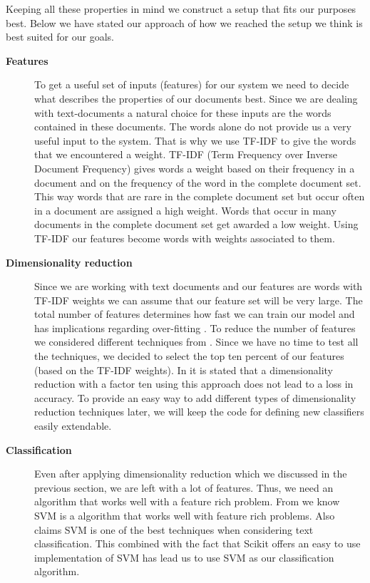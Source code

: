 Keeping all these properties in mind we construct a setup that fits our purposes best.
Below we have stated our approach of how we reached the setup we think is best suited for our goals.

\begin{description}
\item[\textbf{Features}] 
To get a useful set of inputs (features) for our system we need to decide what describes the properties of our documents best. Since we are dealing with text-documents a natural choice for these inputs are the words contained in these documents. 
The words alone do not provide us a very useful input to the system. That is why we use TF-IDF to give the words that we encountered a weight. TF-IDF (Term Frequency over Inverse Document Frequency) gives words a weight based on their frequency in a document and on the frequency of the word in the complete document set. This way words that are rare in the complete document set but occur often in a document are assigned a high weight. Words that occur in many documents in the complete document set get awarded a low weight\cite{ramos_tfidf}.
Using TF-IDF our features become words with weights associated to them.

\item[\textbf{Dimensionality reduction}]
Since we are working with text documents and our features are words with TF-IDF weights we can assume that our feature set will be very large. The total number of features determines how fast we can train our model and has implications regarding over-fitting \cite{ml_text}. To reduce the number of features we considered different techniques from \cite{ml_text}. Since we have no time to test all the techniques, we decided to select the top ten percent of our features (based on the TF-IDF weights). In \cite{yang1997} it is stated that a dimensionality reduction with a factor ten using this approach does not lead to a loss in accuracy. To provide an easy way to add different types of dimensionality reduction techniques later, we will keep the code for defining new classifiers easily extendable.

\item[\textbf{Classification}]
Even after applying dimensionality reduction which we discussed in the previous section, we are left with a lot of features. Thus, we need an algorithm that works well with a feature rich problem. From \cite{MLCheatSheet} we know SVM is a algorithm that works well with feature rich problems. Also \cite{ml_text} claims SVM is one of the best techniques when considering text classification. This combined with the fact that Scikit offers an easy to use implementation of SVM has lead us to use SVM as our classification algorithm.
\end{description}

